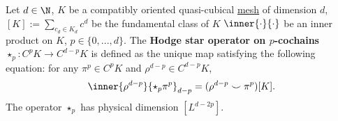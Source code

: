 \begin{definition}
  \label{cmc/mesh/quasi_cubical/hodge_star/concept-definition}
  Let
    $d \in \N$,
    $K$ be a compatibly oriented quasi-cubical
    \hyperref[cmc:mesh:definition]{mesh} of dimension $d$,
    $[K] := \sum_{c_d \in K_d} c^d$ be the fundamental class of $K$
    $\inner{\cdot}{\cdot}$ be an inner product on $K$,
    $p \in \{0, ..., d\}$.
  The \textbf{Hodge star operator on $p$-cochains}
  $\star_p \colon C^p K \to C^{d - p} K$
  is defined as the unique map satisfying the following equation:
  for any $\pi^p \in C^p K$ and $\rho^{d - p} \in C^{d - p} K$,
  \begin{equation}
    \inner{\rho^{d - p}}{\star_p \pi^p}_{d - p}
    = (\rho^{d - p} \smile \pi^p)[K].
  \end{equation}
  The operator $\star_p$ has physical dimension $[L^{d - 2 p}]$.
\end{definition}
